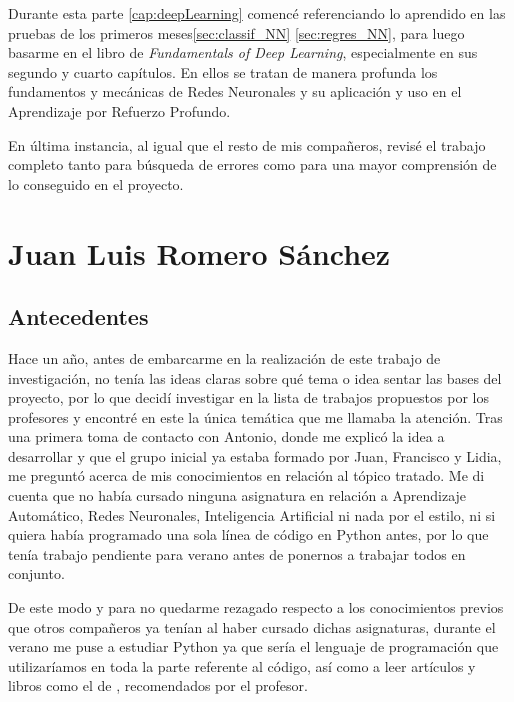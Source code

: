 Durante esta parte \ref{cap:deepLearning} comencé referenciando lo aprendido en las pruebas de los primeros meses\ref{sec:classif_NN} \ref{sec:regres_NN}, para luego basarme en el libro de \textit{Fundamentals of Deep Learning}, especialmente en sus segundo\citep[cap. 2]{Buduma:general} y cuarto \citep[cap. 4]{Buduma:general} capítulos. En ellos se tratan de manera profunda los fundamentos y mecánicas de Redes Neuronales y su aplicación y uso en el Aprendizaje por Refuerzo Profundo.

En última instancia, al igual que el resto de mis compañeros, revisé el trabajo completo tanto para búsqueda de errores como para una mayor comprensión de lo conseguido en el proyecto.

\section{Juan Luis Romero Sánchez}

\subsection{Antecedentes}

Hace un año, antes de embarcarme en la realización de este trabajo de investigación, no tenía las ideas claras sobre qué tema o idea sentar las bases del proyecto, por lo que decidí investigar en la lista de trabajos propuestos por los profesores y encontré en este la única temática que me llamaba la atención. Tras una primera toma de contacto con Antonio, donde me explicó la idea a desarrollar y que el grupo inicial ya estaba formado por Juan, Francisco y Lidia, me preguntó acerca de mis conocimientos en relación al tópico tratado. Me di cuenta que no había cursado ninguna asignatura en relación a Aprendizaje Automático, Redes Neuronales, Inteligencia Artificial ni nada por el estilo, ni si quiera había programado una sola línea de código en Python antes, por lo que tenía trabajo pendiente para verano antes de ponernos a trabajar todos en conjunto.

De este modo y para no quedarme rezagado respecto a los conocimientos previos que otros compañeros ya tenían al haber cursado dichas asignaturas, durante el verano me puse a estudiar Python ya que sería el lenguaje de programación que utilizaríamos en toda la parte referente al código, así como a leer artículos \citep{mnih2013playing} \citep{Turing1950-TURCMA} \citep{Rodriguez2018} y libros como el de \citet{Buduma:general}, recomendados por el profesor. 


